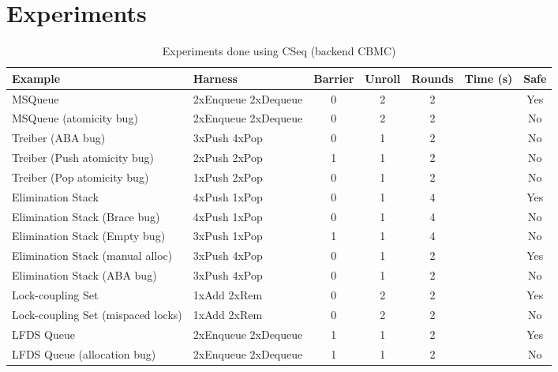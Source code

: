 \section{Experiments} 

\newcommand{\free}{free}
\newcommand{\ababug}{ABA bug}
\newcommand{\Pushm}{Push}
\newcommand{\Popm}{Pop}
\newcommand{\Removem}{Remove}
\newcommand{\Enqueuem}{Enqueue}
\newcommand{\Dequeuem}{Dequeue}
\newcommand{\unlock}{unlock}
\newcommand{\emptybug}{Empty bug}
\newcommand{\bracebug}{Brace bug}


\begin{table}
\begin{tabular}{l|l|c|c|c|c|c}
Example                             & Harness             & Barrier & Unroll  & Rounds  & Time (s)  & Safe \\\hline
MSQueue                             & 2xEnqueue 2xDequeue & 0       & 2       & 2       &           & Yes \\
MSQueue (atomicity bug)             & 2xEnqueue 2xDequeue & 0       & 2       & 2       &           & No \\
Treiber (\ababug{})                 & 3xPush    4xPop     & 0       & 1       & 2       &           & No \\
Treiber (Push atomicity bug)        & 2xPush    2xPop     & 1       & 1       & 2       &           & No \\
Treiber (Pop atomicity bug)         & 1xPush    2xPop     & 0       & 1       & 2       &           & No \\
Elimination Stack                   & 4xPush    1xPop     & 0       & 1       & 4       &           & Yes \\
Elimination Stack (\bracebug)       & 4xPush    1xPop     & 0       & 1       & 4       &           & No \\
Elimination Stack (\emptybug)       & 3xPush    1xPop     & 1       & 1       & 4       &           & No \\
Elimination Stack (manual alloc)    & 3xPush    4xPop     & 0       & 1       & 2       &           & Yes \\
Elimination Stack (\ababug{})       & 3xPush    4xPop     & 0       & 1       & 2       &           & No \\
Lock-coupling Set                   & 1xAdd     2xRem     & 0       & 2       & 2       &           & Yes \\
Lock-coupling Set (mispaced locks)  & 1xAdd     2xRem     & 0       & 2       & 2       &           & No \\
LFDS Queue                          & 2xEnqueue 2xDequeue & 1       & 1       & 2       &           & Yes \\
LFDS Queue (allocation bug)         & 2xEnqueue 2xDequeue & 1       & 1       & 2       &           & No 
\end{tabular} 
\caption{Experiments done using CSeq (backend CBMC)}
\label{tab:exp-static}
\end{table}

